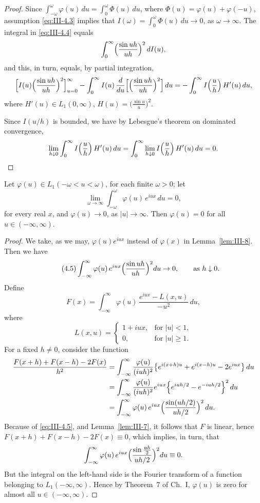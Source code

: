 \begin{proof}
Since $\int_{-\omega}^{\omega}\varphi(u)\,du=\int_{0}^{\omega}\Phi(u)\,du$, where $\Phi(u)=\varphi(u)+\varphi(-u)$, assumption \eqref{eq:III-4.3} implies that $I(\omega)=\int_{0}^{\omega}\Phi(u)\,du\to0$, as $\omega\to\infty$. The integral in \eqref{eq:III-4.4} equals
\[
\int_{0}^{\infty}\Bigl(\frac{\sin uh}{uh}\Bigr)^{2}\,dI(u),
\]
and this, in turn, equals, by partial integration,
\[
\Bigl[I(u)\Bigl(\frac{\sin uh}{uh}\Bigr)^{2}\Bigr]_{u=0}^{\infty}
-\int_{0}^{\infty}I(u)\,\frac{d}{du}\Bigl[\Bigl(\frac{\sin uh}{uh}\Bigr)^{2}\Bigr]\,du
=-\int_{0}^{\infty}I\Bigl(\frac{u}{h}\Bigr)\,H'(u)\,du,
\]
where $H'(u)\in L_{1}(0,\infty)$, $H(u)=\bigl(\frac{\sin u}{u}\bigr)^{2}$.

Since $I(u/h)$ is bounded, we have by Lebesgue's theorem on dominated convergence,
\[
\lim_{h\downarrow0}\int_{0}^{\infty}I\Bigl(\frac{u}{h}\Bigr)\,H'(u)\,du
=\int_{0}^{\infty}\lim_{h\downarrow0}I\Bigl(\frac{u}{h}\Bigr)\,H'(u)\,du=0.
\]
\end{proof}

\begin{lemma}\label{lem:III-9}
Let $\varphi(u)\in L_{1}(-\omega<u<\omega)$, for each finite $\omega>0$; let
\[
\lim_{\omega\to\infty}\int_{-\omega}^{\omega}\varphi(u)\,e^{iux}\,du=0,
\]
for every real $x$, and $\varphi(u)\to0$, as $|u|\to\infty$. Then $\varphi(u)=0$ for all $u\in(-\infty,\infty)$.
\end{lemma}

\begin{proof}
We take, as we may, $\varphi(u)e^{iux}$ instead of $\varphi(x)$ in Lemma~\ref{lem:III-8}. Then we have
\begin{equation}\tag{4.5}\label{eq:III-4.5}
\int_{-\infty}^{\infty}\varphi(u)\,e^{iux}\Bigl(\frac{\sin uh}{uh}\Bigr)^{2}du\to0,\qquad\text{as }h\downarrow0.
\end{equation}
Define
\[
F(x)=\int_{-\infty}^{\infty}\varphi(u)\,\frac{e^{iux}-L(x,u)}{-u^{2}}\,du,
\]
where
\[
L(x,u)=
\begin{cases}
1+iux,&\text{for }|u|<1,\\
0,&\text{for }|u|\ge1.
\end{cases}
\]
For a fixed $h\neq0$, consider the function
\begin{align*}
\frac{F(x+h)+F(x-h)-2F(x)}{h^{2}}
&=\int_{-\infty}^{\infty}\frac{\varphi(u)}{(iuh)^{2}}\bigl\{e^{i(x+h)u}+e^{i(x-h)u}-2e^{iux}\bigr\}\,du\\
&=\int_{-\infty}^{\infty}\frac{\varphi(u)}{(iuh)^{2}}e^{iux}\Bigl\{e^{iuh/2}-e^{-iuh/2}\Bigr\}^{2}\,du\\
&=\int_{-\infty}^{\infty}\varphi(u)\,e^{iux}\Bigl(\frac{\sin(uh/2)}{uh/2}\Bigr)^{2}\,du.
\end{align*}
Because of \eqref{eq:III-4.5}, and Lemma~\ref{lem:III-7}, it follows that $F$ is linear, hence $F(x+h)+F(x-h)-2F(x)\equiv0$, which implies, in turn, that
\[
\int_{-\infty}^{\infty}\varphi(u)\,e^{iux}\Bigl(\frac{\sin\frac{uh}{2}}{uh/2}\Bigr)^{2}du\equiv0.
\]
But the integral on the left-hand side is the Fourier transform of a function belonging to $L_{1}(-\infty,\infty)$. Hence by Theorem~7 of Ch.~I, $\varphi(u)$ is zero for almost all $u\in(-\infty,\infty)$.
\end{proof}

